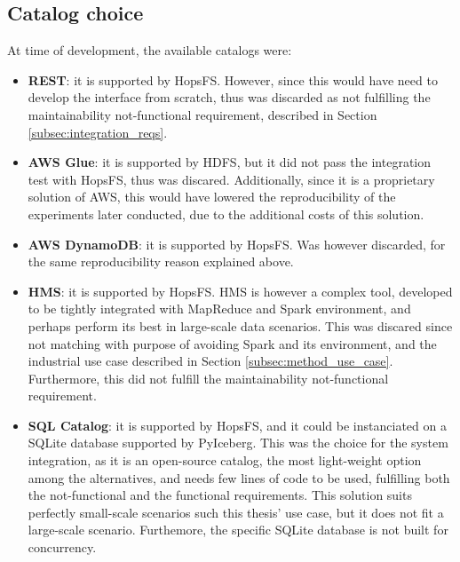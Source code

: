 \subsection{Catalog choice}
\label{subsec:integration_catalog_choice}
At time of development, the available catalogs were:
\begin{itemize}
    \item \textbf{REST}: it is supported by \gls{HopsFS}. However, since this would have need to develop the interface from scratch, thus was discarded as not fulfilling the maintainability not-functional requirement, described in Section \ref{subsec:integration_reqs}.
    \item \textbf{\gls{AWS} Glue}: it is supported by \gls{HDFS}, but it did not pass the integration test with \gls{HopsFS}, thus was discared. Additionally, since it is a proprietary solution of \gls{AWS}, this would have lowered the reproducibility of the experiments later conducted, due to the additional costs of this solution.
    \item \textbf{\gls{AWS} DynamoDB}: it is supported by \gls{HopsFS}. Was however discarded, for the same reproducibility reason explained above.
    \item \textbf{\gls{HMS}}: it is supported by \gls{HopsFS}. \gls{HMS} is however a complex tool, developed to be tightly integrated with MapReduce and Spark environment, and perhaps perform its best in large-scale data scenarios. This was discared since not matching with purpose of avoiding Spark and its environment, and the industrial use case described in Section \ref{subsec:method_use_case}. Furthermore, this did not fulfill the maintainability not-functional requirement.
    \item \textbf{SQL Catalog}: it is supported by \gls{HopsFS}, and it could be instanciated on a SQLite database supported by PyIceberg. This was the choice for the system integration, as it is an open-source catalog, the most light-weight option among the alternatives, and needs few lines of code to be used, fulfilling both the not-functional and the functional requirements. This solution suits perfectly small-scale scenarios such this thesis' use case, but it does not fit a large-scale scenario. Furthemore, the specific SQLite database is not built for concurrency.
\end{itemize}

